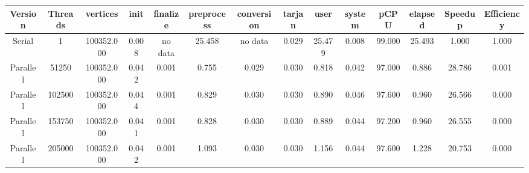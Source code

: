 \begin{tabular}{|c|c|c|c|c|c|c|c|c|c|c|c|c|c|}
\toprule
 Version &  Threads &   vertices &  init & finalize &  preprocess & conversion &  tarjan &   user &  system &   pCPU &  elapsed &  Speedup &  Efficiency \\
\midrule
  Serial &        1 & 100352.000 & 0.008 &  no data &      25.458 &    no data &   0.029 & 25.479 &   0.008 & 99.000 &   25.493 &    1.000 &       1.000 \\
Parallel &    51250 & 100352.000 & 0.042 &    0.001 &       0.755 &      0.029 &   0.030 &  0.818 &   0.042 & 97.000 &    0.886 &   28.786 &       0.001 \\
Parallel &   102500 & 100352.000 & 0.044 &    0.001 &       0.829 &      0.030 &   0.030 &  0.890 &   0.046 & 97.600 &    0.960 &   26.566 &       0.000 \\
Parallel &   153750 & 100352.000 & 0.041 &    0.001 &       0.828 &      0.030 &   0.030 &  0.889 &   0.044 & 97.200 &    0.960 &   26.555 &       0.000 \\
Parallel &   205000 & 100352.000 & 0.042 &    0.001 &       1.093 &      0.030 &   0.030 &  1.156 &   0.044 & 97.600 &    1.228 &   20.753 &       0.000 \\
\bottomrule
\end{tabular}
